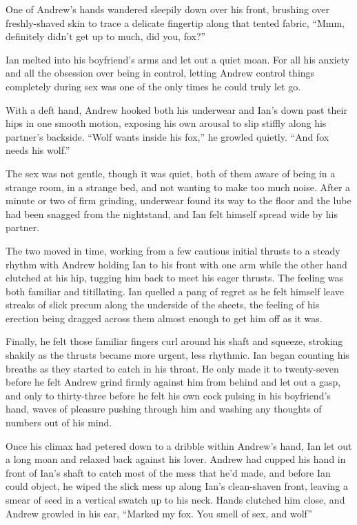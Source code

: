 One of Andrew's hands wandered sleepily down over his front, brushing over freshly-shaved skin to trace a delicate fingertip along that tented fabric, ``Mmm, definitely didn't get up to much, did you, fox?''

Ian melted into his boyfriend's arms and let out a quiet moan. For all his anxiety and all the obsession over being in control, letting Andrew control things completely during sex was one of the only times he could truly let go.

With a deft hand, Andrew hooked both his underwear and Ian's down past their hips in one smooth motion, exposing his own arousal to slip stiffly along his partner's backside. ``Wolf wants inside his fox,'' he growled quietly. ``And fox needs his wolf.''

The sex was not gentle, though it was quiet, both of them aware of being in a strange room, in a strange bed, and not wanting to make too much noise. After a minute or two of firm grinding, underwear found its way to the floor and the lube had been snagged from the nightstand, and Ian felt himself spread wide by his partner.

The two moved in time, working from a few cautious initial thrusts to a steady rhythm with Andrew holding Ian to his front with one arm while the other hand clutched at his hip, tugging him back to meet his eager thrusts. The feeling was both familiar and titillating. Ian quelled a pang of regret as he felt himself leave streaks of slick precum along the underside of the sheets, the feeling of his erection being dragged across them almost enough to get him off as it was.

Finally, he felt those familiar fingers curl around his shaft and squeeze, stroking shakily as the thrusts became more urgent, less rhythmic. Ian began counting his breaths as they started to catch in his throat. He only made it to twenty-seven before he felt Andrew grind firmly against him from behind and let out a gasp, and only to thirty-three before he felt his own cock pulsing in his boyfriend's hand, waves of pleasure pushing through him and washing any thoughts of numbers out of his mind.

Once his climax had petered down to a dribble within Andrew's hand, Ian let out a long moan and relaxed back against his lover. Andrew had cupped his hand in front of Ian's shaft to catch most of the mess that he'd made, and before Ian could object, he wiped the slick mess up along Ian's clean-shaven front, leaving a smear of seed in a vertical swatch up to his neck. Hands clutched him close, and Andrew growled in his ear, ``Marked my fox. You smell of sex, and wolf''

